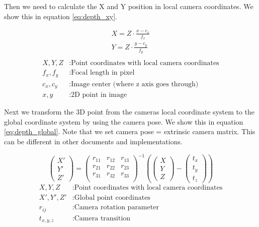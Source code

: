 \documentclass[11pt,a4paper,titlepage,oneside]{report}
\begin{document}
Then we need to calculate the X and Y position in local camera coordinates. We show this in equation \ref{eq:depth_xy}.

\begin{equation}\label{eq:depth_xy}
  \begin{gathered}
    X = Z \cdot \frac{x-c_x}{f_x}\\
    Y = Z \cdot \frac{y-c_y}{f_y}\\
  \end{gathered}
\end{equation}
\begin{align*}
  X,Y,Z    &: \text{Point coordinates with local camera coordinates}\\
  f_x,f_y  &: \text{Focal length in pixel}\\
  c_x,c_y  &: \text{Image center (where z axis goes through)}\\
  x,y      &: \text{2D point in image}
\end{align*}

Next we transform the 3D point from the cameras local coordinate system to the global coordinate system by using the camera pose. We show this in equation \ref{eq:depth_global}. Note that we set camera pose = extrinsic camera matrix. This can be different in other documents and implementations.

\begin{equation}\label{eq:depth_global}
  \begin{pmatrix}
    X'\\
    Y'\\
    Z'
  \end{pmatrix}=
  \begin{pmatrix}
    r_{11} & r_{12} & r_{13}\\
    r_{21} & r_{22} & r_{23}\\
    r_{31} & r_{32} & r_{33}\\
  \end{pmatrix}^{-1}
  \left(
  \begin{pmatrix}
    X\\
    Y\\
    Z
  \end{pmatrix}
  -\begin{pmatrix}
    t_x\\
    t_y\\
    t_z
  \end{pmatrix}
  \right)
\end{equation}
\begin{align*}
  X,Y,Z     &: \text{Point coordinates with local camera coordinates}\\
  X',Y',Z'  &: \text{Global point coordinates}\\
  r_{ij}    &: \text{Camera rotation parameter}\\
  t_{x,y,z} &: \text{Camera transition}
\end{align*}
\end{document}
